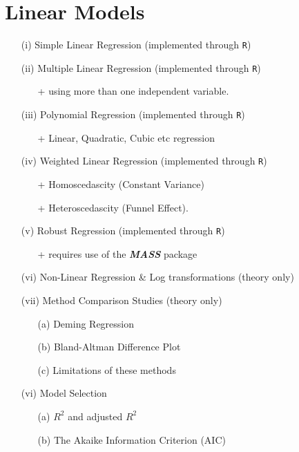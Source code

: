 \documentclass[12pt]{article}
\begin{document}
\section{Linear Models}
\begin{itemize}
\item[(i)] Simple Linear Regression (implemented through \texttt{R})
\item[(ii)] Multiple Linear Regression (implemented through \texttt{R})
\begin{itemize}
\item[+] using more than one independent variable.
\end{itemize}
\item[(iii)] Polynomial Regression (implemented through \texttt{R})
\begin{itemize}
\item[+] Linear, Quadratic, Cubic etc regression
\end{itemize}
\item[(iv)] Weighted Linear Regression (implemented through \texttt{R})
\begin{itemize}
\item[+] Homoscedascity (Constant Variance)
\item[+] Heteroscedascity (Funnel Effect).
\end{itemize}
\item[(v)] Robust Regression (implemented through \texttt{R})
\begin{itemize}
\item[+] requires use of the \textit{\textbf{MASS}} package
\end{itemize}
\item[(vi)] Non-Linear Regression \& Log transformations (theory only)
\item[(vii)] Method Comparison Studies (theory only)
\begin{itemize}
\item[(a)] Deming Regression 
\item[(b)] Bland-Altman Difference Plot
\item[(c)] Limitations of these methods
\end{itemize}
\item[(vi)] Model Selection 
\begin{itemize}
\item[(a)] $R^2$ and adjusted $R^2$ 
\item[(b)] The Akaike Information Criterion (AIC)
\end{itemize}
\end{itemize}
\end{document}
